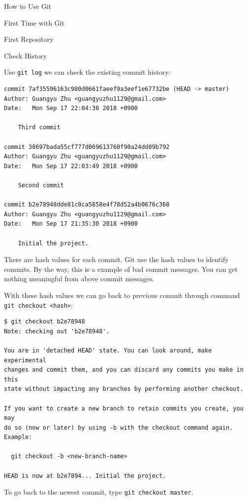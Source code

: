 \documentclass[10pt, a4papaer]{article}
\begin{document}
\begin{section}{How to Use Git}
\begin{subsection}{First Time with Git}
\begin{subsubsection}{First Repository}
\begin{paragraph}{Check History\\}
    
Use \verb|git log| we can check the existing commit history:

\begin{lstlisting}
commit 7af35596163c980d0661faeef9a3eef1e67732be (HEAD -> master)
Author: Guangyu Zhu <guangyuzhu1129@gmail.com>
Date:   Mon Sep 17 22:04:38 2018 +0900

    Third commit

commit 38697bada55cf777d069613760f90a24dd09b792
Author: Guangyu Zhu <guangyuzhu1129@gmail.com>
Date:   Mon Sep 17 22:03:49 2018 +0900

    Second commit

commit b2e78948dde81c0ca5858e4f78d52a4b0676c368
Author: Guangyu Zhu <guangyuzhu1129@gmail.com>
Date:   Mon Sep 17 21:35:30 2018 +0900

    Initial the project.
\end{lstlisting}

There are hash values for each commit. Git use the hash values to identify
commits. By the way, this is a example of bad commit messages. You can get
nothing meaningful from above commit messages.

With these hash values we can go back to previous commit through command\\
\verb|git checkout <hash>|:

\begin{lstlisting}
$ git checkout b2e78948
Note: checking out 'b2e78948'.

You are in 'detached HEAD' state. You can look around, make experimental
changes and commit them, and you can discard any commits you make in this
state without impacting any branches by performing another checkout.

If you want to create a new branch to retain commits you create, you may
do so (now or later) by using -b with the checkout command again. Example:

  git checkout -b <new-branch-name>

HEAD is now at b2e7894... Initial the project.
\end{lstlisting}

To go back to the newest commit, type \verb|git checkout master|.

\end{paragraph}
\end{subsubsection}


\end{subsection}
\end{section}
\end{document}
